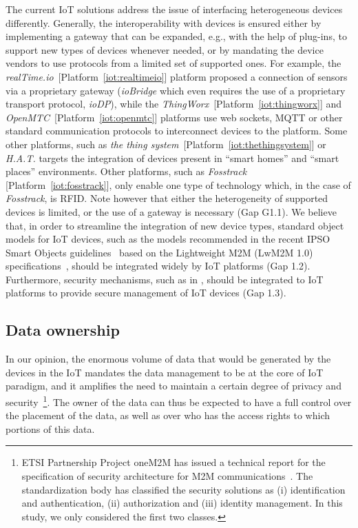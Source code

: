 \documentclass[preprint,10pt,5p]{elsarticle}
\newcommand{\citeiot}[1]{[Platform~\ref{#1}]}
\begin{document}
The current IoT solutions address the issue of interfacing heterogeneous 
devices differently. Generally, the interoperability with devices is ensured 
either by implementing a gateway that can be expanded, e.g., with the 
help of plug-ins, to support new types of devices whenever needed, 
or by mandating the device vendors to use protocols from a limited set 
of supported ones. 
For example, the \emph{realTime.io}~\citeiot{iot:realtimeio} platform
proposed a connection of sensors via a proprietary gateway
(\emph{ioBridge} which even requires the use of a proprietary
transport protocol, \emph{ioDP}), while the
\emph{ThingWorx}~\citeiot{iot:thingworx} and
\emph{OpenMTC}~\citeiot{iot:openmtc} platforms use web sockets,
MQTT or other standard communication protocols to interconnect devices
to the platform. 
Some other platforms, such as 
\emph{the thing system}~\citeiot{iot:thethingsystem} or \emph{H.A.T.}
targets the  integration of devices present in ``smart homes'' and
``smart places'' environments. 
Other platforms, such as \emph{Fosstrack} \citeiot{iot:fosstrack},
only enable one type of technology which, in the case of
\emph{Fosstrack}, is RFID. 
Note however that either the heterogeneity of supported devices is limited, 
or the use of a gateway is necessary (Gap G1.1).
We believe that, in order to streamline the integration of new device types, 
standard object models for IoT devices, such as the models recommended in the recent
IPSO Smart Objects guidelines~\cite{IPSOAlliance2014} based
on the Lightweight M2M (LwM2M 1.0) specifications~\cite{OMA2013},
should be integrated widely by IoT platforms (Gap 1.2).
Furthermore, security mechanisms, such as in \cite{Asokan2015}, 
should be integrated to IoT platforms to provide secure management of 
IoT devices (Gap 1.3).

\subsection{Data ownership}
\label{sec:gap_ownership}

In our opinion, the enormous volume of data that would be generated by the
devices in the IoT mandates the data management to be at the core of IoT 
paradigm,  and it amplifies the need to maintain a certain degree of privacy 
and security~\cite{Roman2011}\footnote{ETSI Partnership Project oneM2M
has issued a  technical report for the
specification of security architecture for M2M
communications~\cite{oneM2M2015}. The standardization body has
classified the security solutions as (i) identification and
authentication, (ii) authorization and (iii) identity management.
In this study, we only considered the first two classes.}.
The owner of the data can thus be expected to have a full control over the placement 
of the data, as well as over who has the access rights to which portions of this data. 
\end{document}
